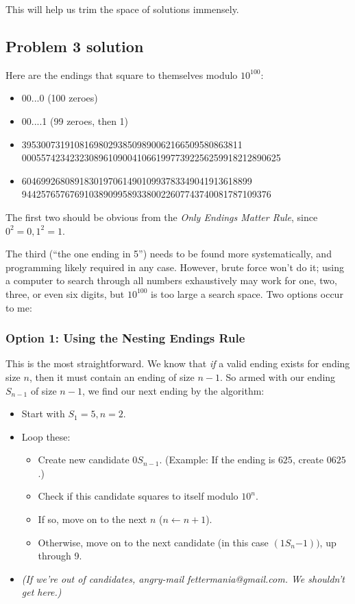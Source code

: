 \documentclass[11pt, oneside]{article} 	%
\begin{document}
This will help us trim the space of solutions immensely.

\subsection{Problem 3 solution}

Here are the endings that square to themselves modulo $10^{100}$:
\begin{itemize}
\item  00...0 (100 zeroes)
\item  00....1 (99 zeroes, then 1)
\item 3953007319108169802938509890062166509580863811 \\ 
000557423423230896109004106619977392256259918212890625
\item 604699268089183019706149010993783349041913618899 \\
9442576576769103890995893380022607743740081787109376
\end{itemize}

The first two should be obvious from the \emph{Only Endings Matter Rule}, since $0^2 = 0, 1^2=1$.  

The third (``the one ending in 5'') needs to be found more systematically, and programming likely required in any case.  However, brute force won't do it; using a computer to search through all numbers exhaustively may work for one, two, three, or even six digits, but $10^{100}$ is too large a search space.  Two options occur to me:

\subsubsection{Option 1: Using the Nesting Endings Rule}

This is the most straightforward.  We know that \emph{if} a valid ending exists for ending size $n$, then it must contain an ending of size $n-1$.  So armed with our ending $S_{n-1}$ of size $n-1$, we find our next ending by the algorithm:
\begin{itemize}
\item Start with $S_1 = 5, n = 2$.
\item Loop these: 
\begin{itemize}
\item Create new candidate $0S_{n-1}$.  (Example: If the ending is $625$, create $0625$.)
\item Check if this candidate squares to itself modulo $10^n$.  
\item If so, move on to the next $n$ ($n \leftarrow n + 1$).
\item Otherwise, move on to the next candidate (in this case $(1S_n{-1}))$, up through 9.
\end{itemize}
\item \emph{(If we're out of candidates, angry-mail fettermania@gmail.com.  We shouldn't get here.)}
\end{itemize}
\end{document}
